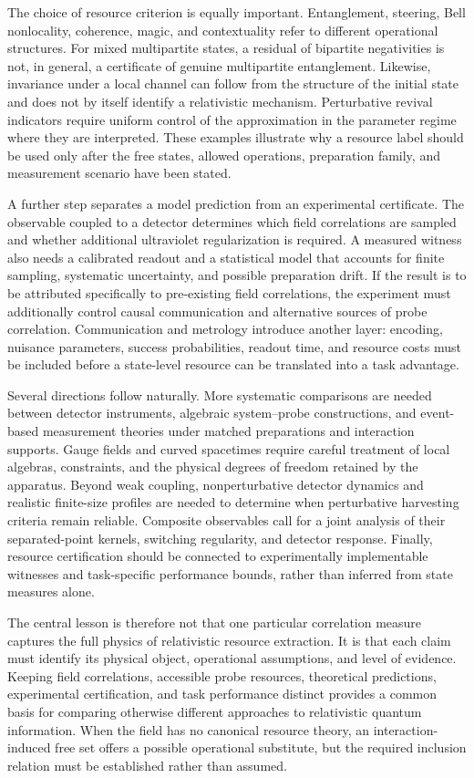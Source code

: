 \documentclass[pdflatex,sn-mathphys-num]{sn-jnl}
\begin{document}
The choice of resource criterion is equally important. Entanglement, steering, Bell nonlocality, coherence, magic, and contextuality refer to different operational structures. For mixed multipartite states, a residual of bipartite negativities is not, in general, a certificate of genuine multipartite entanglement. Likewise, invariance under a local channel can follow from the structure of the initial state and does not by itself identify a relativistic mechanism. Perturbative revival indicators require uniform control of the approximation in the parameter regime where they are interpreted. These examples illustrate why a resource label should be used only after the free states, allowed operations, preparation family, and measurement scenario have been stated.

A further step separates a model prediction from an experimental certificate. The observable coupled to a detector determines which field correlations are sampled and whether additional ultraviolet regularization is required. A measured witness also needs a calibrated readout and a statistical model that accounts for finite sampling, systematic uncertainty, and possible preparation drift. If the result is to be attributed specifically to pre-existing field correlations, the experiment must additionally control causal communication and alternative sources of probe correlation. Communication and metrology introduce another layer: encoding, nuisance parameters, success probabilities, readout time, and resource costs must be included before a state-level resource can be translated into a task advantage.

Several directions follow naturally. More systematic comparisons are needed between detector instruments, algebraic system--probe constructions, and event-based measurement theories under matched preparations and interaction supports. Gauge fields and curved spacetimes require careful treatment of local algebras, constraints, and the physical degrees of freedom retained by the apparatus. Beyond weak coupling, nonperturbative detector dynamics and realistic finite-size profiles are needed to determine when perturbative harvesting criteria remain reliable. Composite observables call for a joint analysis of their separated-point kernels, switching regularity, and detector response. Finally, resource certification should be connected to experimentally implementable witnesses and task-specific performance bounds, rather than inferred from state measures alone.

The central lesson is therefore not that one particular correlation measure captures the full physics of relativistic resource extraction. It is that each claim must identify its physical object, operational assumptions, and level of evidence. Keeping field correlations, accessible probe resources, theoretical predictions, experimental certification, and task performance distinct provides a common basis for comparing otherwise different approaches to relativistic quantum information. When the field has no canonical resource theory, an interaction-induced free set offers a possible operational substitute, but the required inclusion relation must be established rather than assumed.
\end{document}

